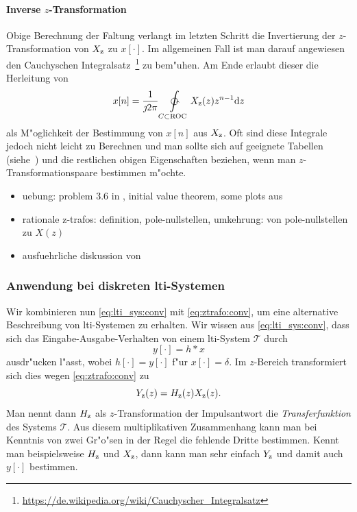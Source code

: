 \paragraph{Inverse \texorpdfstring{$z$}{z}-Transformation}
Obige Berechnung der Faltung verlangt im letzten Schritt die Invertierung der $z$-Transformation von $X_{{\rm z}}$ zu $x[\cdot]$.
Im allgemeinen Fall ist man darauf angewiesen den Cauchyschen Integralsatz~\footnote{\url{https://de.wikipedia.org/wiki/Cauchyscher_Integralsatz}} zu bem"uhen.
Am Ende erlaubt dieser die Herleitung von
\begin{equation}\label{eq:ztrafo:inv}
    x[n] = \frac{1}{\jmath 2 \pi} \ointctrclockwise\limits_{C \subset \mathrm{ROC}} X_{\z}(z) z^{n-1} \mathrm{d}z
\end{equation}
als M"oglichkeit der Bestimmung von $x[n]$ aus $X_{{\rm z}}$.
Oft sind diese Integrale jedoch nicht leicht zu Berechnen und man sollte sich auf geeignete Tabellen (siehe~\cite[Tabelle~3.2,~Tabelle~3.3]{proakis2013}) und die restlichen obigen Eigenschaften beziehen, wenn man $z$-Transformationspaare bestimmen m"ochte.
\begin{itemize}
    \item uebung: problem 3.6 in \cite{proakis2013}, initial value theorem, some plots aus \cite{proakis2013}
    \item rationale z-trafos: definition, pole-nullstellen, umkehrung: von pole-nullstellen zu $X(z)$
    \item ausfuehrliche diskussion von \cite[fig 3.3.5, 3.3.6]{proakis2013} 
\end{itemize}
%
%
\subsubsection{Anwendung bei diskreten \texorpdfstring{\gls{lti}}{LTI}-Systemen}
%
Wir kombinieren nun \eqref{eq:lti_sys:conv} mit \eqref{eq:ztrafo:conv}, um eine alternative Beschreibung von \gls{lti}-Systemen zu erhalten.
Wir wissen aus \eqref{eq:lti_sys:conv}, dass sich das Eingabe-Ausgabe-Verhalten von einem \gls{lti}-System $\mathcal{T}$ durch
\[
y[\cdot] = h \ast x
\]
ausdr"ucken l"asst, wobei $h[\cdot] = y[\cdot]$ f"ur $x[\cdot]=\delta$.
Im $z$-Bereich transformiert sich dies wegen \eqref{eq:ztrafo:conv} zu
\begin{equation}\label{eq:ztrafo:transfer_function}
    Y_{\rm z}(z) = H_{\rm z}(z) X_{\rm z}(z).
\end{equation}
Man nennt dann $H_{{\rm z}}$ als $z$-Transformation der Impulsantwort die \emph{Transferfunktion} des Systems $\mathcal{T}$.
Aus diesem multiplikativen Zusammenhang kann man bei Kenntnis von zwei Gr"o"sen in der Regel die fehlende Dritte bestimmen.
Kennt man beispielsweise $H_{\rm z}$ und $X_{\rm z}$, dann kann man sehr einfach $Y_{\rm z}$ und damit auch $y[\cdot]$ bestimmen.

